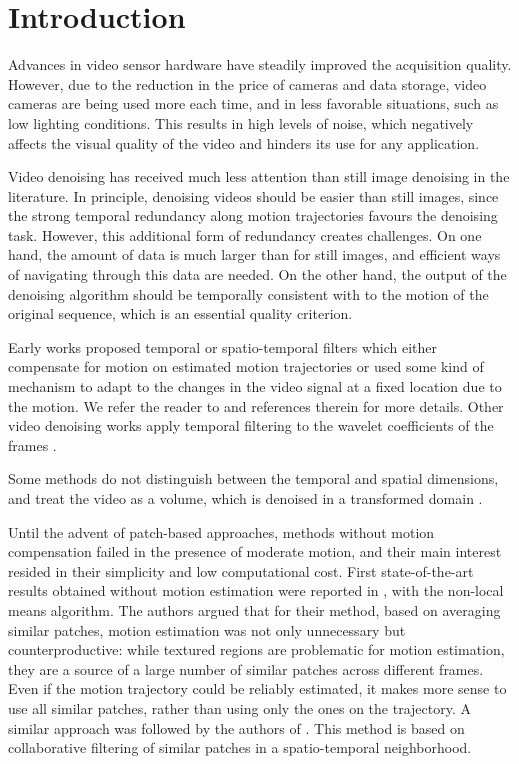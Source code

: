 \documentclass[10pt, journal, twocolumn, final, a4paper]{IEEEtran}
\newcommand{\pcomment}[1]{}
\begin{document}
%
\section{Introduction}
%

Advances in video sensor hardware have steadily improved the acquisition
quality. However, due to the reduction in the price of cameras
and data storage, video cameras are being used more each time, and in less
favorable situations, such as low lighting conditions. This results in high 
levels of noise, which negatively affects the visual quality of the video and
hinders its use for any application. 
\pcomment{It would be nice to have some reference for these claims about
sensors, camera prices, etc.}

Video denoising has received much less attention than still image denoising in
the literature.  In principle, denoising videos should be easier than still
images, since the strong temporal redundancy along motion trajectories favours
the denoising task. However, this additional form of redundancy creates
challenges.  On one hand, the amount of data is much larger than for still
images, and efficient ways of navigating through this data are needed. On the
other hand, the output of the denoising algorithm should be temporally
consistent with to the motion of the original sequence, which is an essential
quality criterion.

Early works proposed temporal or spatio-temporal filters which either compensate
for motion on estimated motion trajectories or used some kind of mechanism to
adapt to the changes in the video signal at a fixed location due to the motion.
We refer the reader to \cite{Brailean1995a} and references therein for more details.
Other video denoising works apply temporal filtering to the wavelet coefficients 
of the frames \cite{Jin2006,Zlokolica2006a}. 

Some methods do not distinguish between the temporal and spatial dimensions,
and treat the video as a volume, which is denoised in a transformed domain
\cite{Rajpoot2003,Wilson2004,Selesnick2003}. 
\pcomment{TODO: Read these references. Even if they consider a 3D transform, I think
they DO distinguish between space and time}

Until the advent of patch-based approaches, methods without motion compensation
failed in the presence of moderate motion, and their main interest resided
in their simplicity and low computational cost. First state-of-the-art results
obtained without motion estimation were reported in \cite{Buades2005v}, with the
non-local means algorithm. The authors argued that for their method, based on
averaging similar patches, motion estimation was not only unnecessary but
counterproductive: while textured regions are problematic for motion
estimation, they are a source of a large number of similar patches across
different frames. Even if the motion trajectory could be reliably estimated, it
makes more sense to use all similar patches, rather than using only the ones on the
trajectory.
%
A similar approach was followed by the authors of \cite{Dabov2007v}. This method is based
on collaborative filtering of similar patches in a
spatio-temporal neighborhood. 
\end{document}
